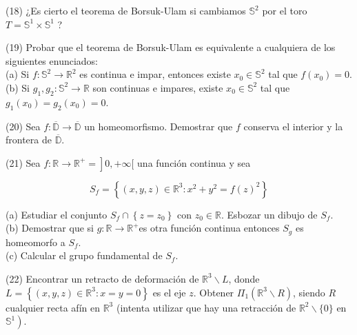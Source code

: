 \documentclass[
  a4paper,
  spanish,
  12pt,
]{scrartcl}
\begin{document}
\begin{ejer}
(18) ¿Es cierto el teorema de Borsuk-Ulam si cambiamos $\mathbb{S}^{2}$ por el toro $T=\mathbb{S}^{1} \times \mathbb{S}^{1}$ ?\\
\end{ejer}

\begin{ejer}
(19) Probar que el teorema de Borsuk-Ulam es equivalente a cualquiera de los siguientes enunciados:\\
(a) Si $f: \mathbb{S}^{2} \rightarrow \mathbb{R}^{2}$ es continua e impar, entonces existe $x_{0} \in \mathbb{S}^{2}$ tal que $f\left(x_{0}\right)=0$.\\
(b) Si $g_{1}, g_{2}: \mathbb{S}^{2} \rightarrow \mathbb{R}$ son continuas e impares, existe $x_{0} \in \mathbb{S}^{2}$ tal que $g_{1}\left(x_{0}\right)=g_{2}\left(x_{0}\right)=0$.\\
\end{ejer}

\begin{ejer}
(20) Sea $f: \overline{\mathbb{D}} \rightarrow \overline{\mathbb{D}}$ un homeomorfismo. Demostrar que $f$ conserva el interior y la frontera de $\overline{\mathbb{D}}$.\\
\end{ejer}

\begin{ejer}
(21) Sea $\left.f: \mathbb{R} \rightarrow \mathbb{R}^{+}=\right] 0,+\infty[$ una función continua y sea

$$
S_{f}=\left\{(x, y, z) \in \mathbb{R}^{3}: x^{2}+y^{2}=f(z)^{2}\right\}
$$

(a) Estudiar el conjunto $S_{f} \cap\left\{z=z_{0}\right\}$ con $z_{0} \in \mathbb{R}$. Esbozar un dibujo de $S_{f}$.\\
(b) Demostrar que si $g: \mathbb{R} \rightarrow \mathbb{R}^{+}$es otra función continua entonces $S_{g}$ es homeomorfo a $S_{f}$.\\
(c) Calcular el grupo fundamental de $S_{f}$.\\

\end{ejer}

\begin{ejer}
(22) Encontrar un retracto de deformación de $\mathbb{R}^{3} \backslash L$, donde $L=\left\{(x, y, z) \in \mathbb{R}^{3}: x=y=0\right\}$ es el eje $z$. Obtener $\Pi_{1}\left(\mathbb{R}^{3} \backslash R\right)$, siendo $R$ cualquier recta afín en $\mathbb{R}^{3}$ (intenta utilizar que hay una retracción de $\mathbb{R}^{2} \backslash\{0\}$ en $\left.\mathbb{S}^{1}\right)$.\\
\end{ejer}
\end{document}
